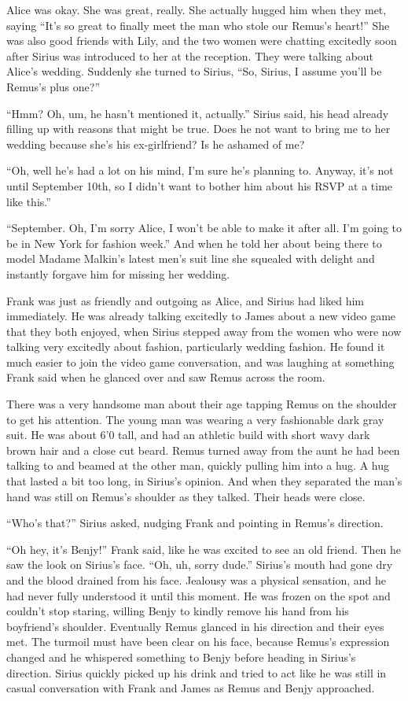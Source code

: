 \documentclass[12pt,twoside,openright]{memoir}
\begin{document}
Alice was okay. She was great, really. She actually hugged him when they met, saying ``It's so great to finally meet the man who stole our Remus's heart!'' She was also good friends with Lily, and the two women were chatting excitedly soon after Sirius was introduced to her at the reception. They were talking about Alice's wedding. Suddenly she turned to Sirius, ``So, Sirius, I assume you'll be Remus's plus one?''

``Hmm? Oh, um, he hasn't mentioned it, actually.'' Sirius said, his head already filling up with reasons that might be true. Does he not want to bring me to her wedding because she's his ex-girlfriend? Is he ashamed of me? 

``Oh, well he's had a lot on his mind, I'm sure he's planning to. Anyway, it's not until September 10th, so I didn't want to bother him about his RSVP at a time like this.''

``September. Oh, I'm sorry Alice, I won't be able to make it after all. I'm going to be in New York for fashion week.''
And when he told her about being there to model Madame Malkin's latest men's suit line she squealed with delight and instantly forgave him for missing her wedding.

Frank was just as friendly and outgoing as Alice, and Sirius had liked him immediately. He was already talking excitedly to James about a new video game that they both enjoyed, when Sirius stepped away from the women who were now talking very excitedly about fashion, particularly wedding fashion. He found it much easier to join the video game conversation, and was laughing at something Frank said when he glanced over and saw Remus across the room.

There was a very handsome man about their age tapping Remus on the shoulder to get his attention. The young man was wearing a very fashionable dark gray suit. He was about 6'0 tall, and had an athletic build with short wavy dark brown hair and a close cut beard. Remus turned away from the aunt he had been talking to and beamed at the other man, quickly pulling him into a hug. A hug that lasted a bit too long, in Sirius's opinion. And when they separated the man's hand was still on Remus's shoulder as they talked. Their heads were close. 

``Who's that?'' Sirius asked, nudging Frank and pointing in Remus's direction. 

``Oh hey, it's Benjy!'' Frank said, like he was excited to see an old friend. Then he saw the look on Sirius's face. ``Oh, uh, sorry dude.'' Sirius's mouth had gone dry and the blood drained from his face. Jealousy was a physical sensation, and he had never fully understood it until this moment. He was frozen on the spot and couldn't stop staring, willing Benjy to kindly remove his hand from his boyfriend's shoulder. Eventually Remus glanced in his direction and their eyes met. The turmoil must have been clear on his face, because Remus's expression changed and he whispered something to Benjy before heading in Sirius's direction. Sirius quickly picked up his drink and tried to act like he was still in casual conversation with Frank and James as Remus and Benjy approached.
\end{document}
